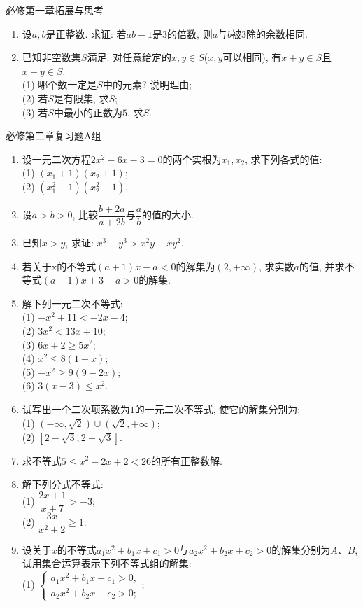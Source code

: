 \documentclass[10pt,a4paper]{article}
\begin{document}
必修第一章拓展与思考
\begin{enumerate}[1.]
\item 设$a,b$是正整数. 求证: 若$ab-1$是$3$的倍数, 则$a$与$b$被$3$除的余数相同.
\item 已知非空数集$S$满足: 对任意给定的$x,y\in S$($x,y$可以相同), 有$x+y\in S$且$x-y\in S$.\\
(1) 哪个数一定是$S$中的元素? 说明理由;\\
(2) 若$S$是有限集, 求$S$;\\
(3) 若$S$中最小的正数为$5$, 求$S$.
\end{enumerate}

必修第二章复习题A组
\begin{enumerate}[1.]
\item 设一元二次方程$2x^2-6x-3=0$的两个实根为$x_1,x_2$, 求下列各式的值:\\
(1) $(x_1+1)(x_2+1)$;\\
(2) $(x_1^2-1)(x_2^2-1)$.
\item 设$a>b>0$, 比较$\dfrac{b+2a}{a+2b}$与$\dfrac ab$的值的大小.
\item 已知$x>y$, 求证: $x^3-y^3>x^2y-xy^2$.
\item 若关于x的不等式$(a+1)x-a<0$的解集为$(2,+\infty)$, 求实数$a$的值, 并求不等式$(a-1)x+3-a>0$的解集.
\item 解下列一元二次不等式:\\
(1) $-x^2+11<-2x-4$;\\
(2) $3x^2<13x+10$;\\
(3) $6x+2\ge 5x^2$;\\
(4) $x^2\le 8(1-x)$;\\
(5) $-x^2\ge 9(9-2x)$;\\
(6) $3(x-3)\le x^2$.
\item 试写出一个二次项系数为$1$的一元二次不等式, 使它的解集分别为:\\
(1) $(-\infty, \sqrt 2)\cup  (\sqrt 2, +\infty)$;\\
(2) $[2-\sqrt 3, 2+\sqrt 3]$.
\item 求不等式$5\le x^2-2x+2<26$的所有正整数解.
\item 解下列分式不等式:\\
(1) $\dfrac{2x+1}{x+7}>-3$;\\
(2) $\dfrac{3x}{x^2+2}\ge 1$.
\item 设关于$x$的不等式$a_1x^2+b_1x+c_1>0$与$a_2x^2+b_2x+c_2>0$的解集分别为$A$、$B$,
试用集合运算表示下列不等式组的解集:\\
(1) $\begin{cases} a_1x^2+b_1x+c_1>0, \\ a_2x^2+b_2x+c_2>0;\end{cases}$;\\

\end{enumerate}
\end{document}
